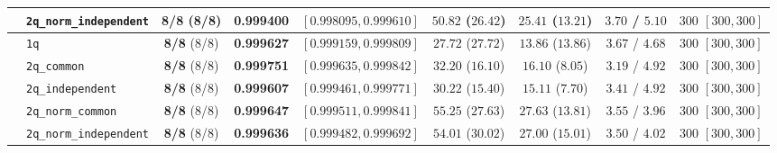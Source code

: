 \documentclass[10pt,a4paper]{article}
\begin{document}
\begin{table}[h!]
{\begin{tabular}{llccccccc}
  & \texttt{2q\_norm\_independent} & \textbf{8/8} (8/8) & \textbf{0.999400} & $[0.998095, 0.999610]$ & $50.82$ ($26.42$) & $25.41$ ($13.21$) & $3.70$ / $5.10$ & $300$ $[300, 300]$ \\
\midrule
  & \texttt{1q} & \textbf{8/8} (8/8) & \textbf{0.999627} & $[0.999159, 0.999809]$ & $27.72$ ($27.72$) & $13.86$ ($13.86$) & $3.67$ / $4.68$ & $300$ $[300, 300]$ \\
  & \texttt{2q\_common} & \textbf{8/8} (8/8) & \textbf{0.999751} & $[0.999635, 0.999842]$ & $32.20$ ($16.10$) & $16.10$ ($8.05$) & $3.19$ / $4.92$ & $300$ $[300, 300]$ \\
  & \texttt{2q\_independent} & \textbf{8/8} (8/8) & \textbf{0.999607} & $[0.999461, 0.999771]$ & $30.22$ ($15.40$) & $15.11$ ($7.70$) & $3.41$ / $4.92$ & $300$ $[300, 300]$ \\
  & \texttt{2q\_norm\_common} & \textbf{8/8} (8/8) & \textbf{0.999647} & $[0.999511, 0.999841]$ & $55.25$ ($27.63$) & $27.63$ ($13.81$) & $3.55$ / $3.96$ & $300$ $[300, 300]$ \\
  & \texttt{2q\_norm\_independent} & \textbf{8/8} (8/8) & \textbf{0.999636} & $[0.999482, 0.999692]$ & $54.01$ ($30.02$) & $27.00$ ($15.01$) & $3.50$ / $4.02$ & $300$ $[300, 300]$ \\
\bottomrule
\end{tabular}%
}
\end{table}

\newpage
\end{document}
